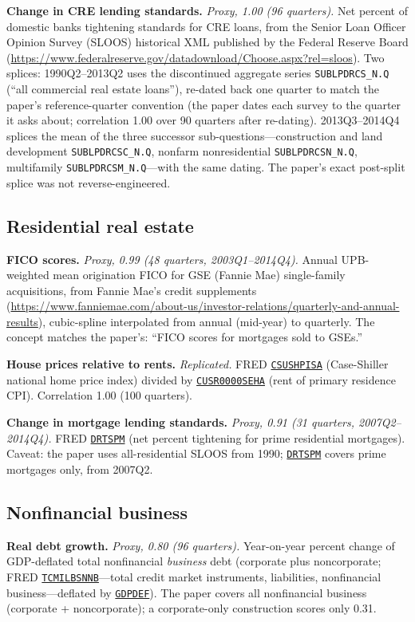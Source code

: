 \documentclass[11pt]{article}
\newcommand{\fred}[1]{\href{https://fred.stlouisfed.org/series/#1}{\texttt{#1}}}
\begin{document}
\textbf{Change in CRE lending standards.} \textit{Proxy, 1.00
(96 quarters).} Net percent of domestic banks tightening standards for
CRE loans, from the Senior Loan Officer Opinion Survey (SLOOS)
historical XML published by the Federal Reserve Board
(\url{https://www.federalreserve.gov/datadownload/Choose.aspx?rel=sloos}).  Two splices:
1990Q2--2013Q2 uses the discontinued aggregate series
\texttt{SUBLPDRCS\_N.Q} (``all commercial real estate loans''),
re-dated back one quarter to match the paper's reference-quarter
convention (the paper dates each survey to the quarter it asks about;
correlation 1.00 over 90 quarters after re-dating).  2013Q3--2014Q4
splices the mean of the three successor sub-questions---construction
and land development \texttt{SUBLPDRCSC\_N.Q}, nonfarm nonresidential
\texttt{SUBLPDRCSN\_N.Q}, multifamily \texttt{SUBLPDRCSM\_N.Q}---with
the same dating.  The paper's exact post-split splice was not
reverse-engineered.

\subsection{Residential real estate}

\textbf{FICO scores.} \textit{Proxy, 0.99 (48 quarters, 2003Q1--2014Q4).}
Annual UPB-weighted mean origination FICO for GSE (Fannie Mae)
single-family acquisitions, from Fannie Mae's credit supplements
(\url{https://www.fanniemae.com/about-us/investor-relations/quarterly-and-annual-results}),
cubic-spline interpolated from annual (mid-year) to quarterly.  The
concept matches the paper's: ``FICO scores for mortgages sold to
GSEs.''

\textbf{House prices relative to rents.} \textit{Replicated.} FRED
\fred{CSUSHPISA} (Case-Shiller national home price index) divided by
\fred{CUSR0000SEHA} (rent of primary residence CPI).  Correlation
1.00 (100 quarters).

\textbf{Change in mortgage lending standards.} \textit{Proxy, 0.91
(31 quarters, 2007Q2--2014Q4).} FRED \fred{DRTSPM} (net percent
tightening for prime residential mortgages).  Caveat: the paper uses
all-residential SLOOS from 1990; \fred{DRTSPM} covers prime mortgages
only, from 2007Q2.

\subsection{Nonfinancial business}

\textbf{Real debt growth.} \textit{Proxy, 0.80 (96 quarters).}
Year-on-year percent change of GDP-deflated total nonfinancial
\textit{business} debt (corporate plus noncorporate; FRED
\fred{TCMILBSNNB}---total credit market instruments, liabilities,
nonfinancial business---deflated by \fred{GDPDEF}).  The paper covers
all nonfinancial business (corporate + noncorporate); a corporate-only
construction scores only 0.31.
\end{document}
